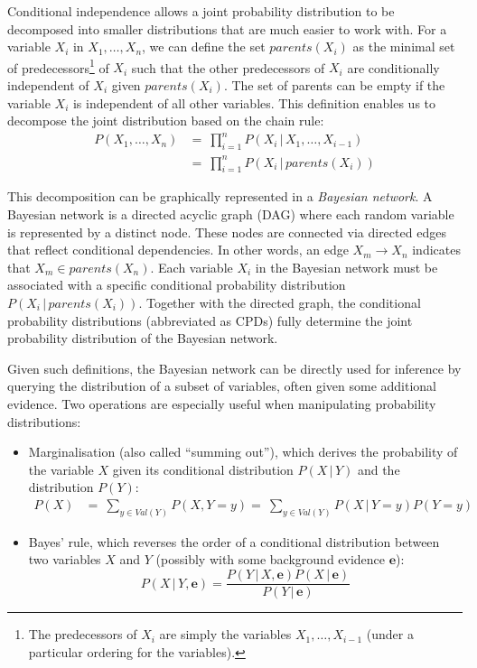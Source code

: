 Conditional independence allows a joint probability distribution to be decomposed into smaller distributions that are much easier to work with.  For a variable $X_i$ in $ X_1, \dots, X_n$, we can define the set $\mathit{parents}(X_i)$ as the minimal set of predecessors\footnote{The predecessors of $X_i$ are simply the variables $X_1,\dots, X_{i-1}$ (under a particular ordering for the variables).} of $X_i$ such that the other predecessors of $X_i$ are conditionally independent of $X_i$ given $\mathit{parents}(X_i)$.  The set of parents can be empty if the variable $X_i$ is independent of all other variables. This definition enables us to decompose the joint distribution based on the chain rule:
\begin{align}
P(X_1, \dots, X_n) & = \ \prod_{i=1}^n P(X_i  \, | \,  X_1, \dots, X_{i-1}) \\
&= \ \prod_{i=1}^n P(X_i  \, | \,  \mathit{parents}(X_i)) 
\end{align}

This decomposition can be graphically represented in a \textit{Bayesian network}.  A Bayesian network is a directed acyclic graph (DAG) where each random variable is represented by a distinct node.  These nodes are connected via directed edges that reflect conditional dependencies. In other words, an edge $X_m \rightarrow X_n$ indicates that $X_m \in \mathit{parents}(X_n)$. Each variable $X_i$ in the Bayesian network must be associated with a specific conditional probability distribution $P(X_i  \, | \,  \mathit{parents}(X_i))$.   Together with the directed graph, the conditional probability distributions (abbreviated as CPDs) fully determine the joint probability distribution of the Bayesian network.   

Given such definitions, the Bayesian network can be directly used for inference by querying the distribution of a subset of variables, often given some additional evidence. Two operations are especially useful when manipulating probability distributions: 
\begin{itemize}
\item Marginalisation (also called ``summing out''), which derives the probability of the variable $X$ given its conditional distribution $P(X \, | \, Y)$ and the distribution $P(Y)$: 
\begin{align}
P(X) & = \ \sum_{y \in \mathit{Val}(Y)} P(X,Y\!=\!y) = \ \sum_{y \in \mathit{Val}(Y)} P(X \, | \, Y\!=\!y) P(Y\!=\!y)
\end{align}
\item Bayes' rule, which reverses the order of a conditional distribution between two variables $X$ and $Y$ (possibly with some background evidence $\mathbf{e}$): 
\begin{equation}
P(X \, | \, Y, \mathbf{e}) = \frac{P(Y \, | \, X, \mathbf{e}) P(X \, | \, \mathbf{e})} {P(Y \, | \, \mathbf{e})} \label{eq:genbayes}
\end{equation}
\end{itemize}

